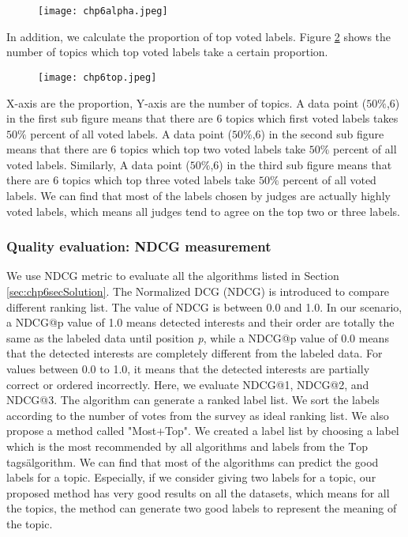 \begin{figure}[htp]
\caption{}
\label{fig:chp6alpha} 
\centering
\texttt{[image: chp6alpha.jpeg]}  
\end{figure}


In addition, we calculate the proportion of top voted labels. Figure \ref{fig:chp6top} shows the number of topics which top voted labels take a certain proportion.
\begin{figure}[htp]
\centering
\texttt{[image: chp6top.jpeg]}  
\caption{}
\label{fig:chp6top} 
\end{figure}
X-axis are the proportion, Y-axis are the number of topics. A data point ($50\%$,6) in the first sub figure means that there are 6 topics which first voted labels takes $50\%$ percent of all voted labels. A data point ($50\%$,6) in the second sub figure means that there are 6 topics which top two voted labels take $50\%$ percent of all voted labels. Similarly, A data point ($50\%$,6) in the third sub figure means that there are 6 topics which top three voted labels take $50\%$ percent of all voted labels. We can find that most of the labels chosen by judges are actually highly voted labels, which means all judges tend to agree on the top two or three labels.




\subsubsection{Quality evaluation: NDCG measurement}
We use NDCG metric to evaluate all the algorithms listed in Section \ref{sec:chp6secSolution}. The Normalized DCG (NDCG) is introduced to compare different ranking list. The value of NDCG is between 0.0 and 1.0. In our scenario, a NDCG@p value of 1.0 means detected interests and their order are totally the same as the labeled data until position \textit{p}, while a NDCG@p value of 0.0 means that the detected interests are completely different from the labeled data. For values between 0.0 to 1.0, it means that the detected interests are partially correct or ordered incorrectly. %
Here, we evaluate NDCG@1, NDCG@2, and NDCG@3. The algorithm can generate a ranked label list. We sort the labels according to the number of votes from the survey as ideal ranking list. We also propose a method called "Most+Top". We created a label list by choosing a label which is the most recommended by all algorithms and labels from the \"Top tags\" algorithm. We can find that most of the algorithms can predict the good labels for a topic. Especially, if we consider giving two labels for a topic, our proposed method has very good results on all the datasets, which means for all the topics, the method can generate two good labels to represent the meaning of the topic.

